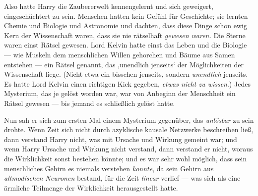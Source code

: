 Also hatte Harry die Zaubererwelt kennengelernt und sich geweigert, eingeschüchtert zu sein. Menschen hatten kein Gefühl für Geschichte; sie lernten Chemie und Biologie und Astronomie und dachten, dass diese Dinge schon ewig Kern der Wissenschaft waren, dass sie nie rätselhaft \emph{gewesen waren.} Die Sterne waren einst Rätsel gewesen. Lord Kelvin hatte einst das Leben und die Biologie — wie Muskeln dem menschlichen Willen gehorchen und Bäume aus Samen entstehen — ein Rätsel genannt, das ‚unendlich jenseits‘ der Möglichkeiten der Wissenschaft liege. (Nicht etwa ein bisschen jenseits, sondern \emph{unendlich} jenseits. Es hatte Lord Kelvin einen richtigen Kick gegeben, \emph{etwas nicht zu wissen}.) Jedes Mysterium, das je gelöst worden war, war von Anbeginn der Menschheit ein Rätsel gewesen — bis jemand es schließlich gelöst hatte.

Nun sah er sich zum ersten Mal einem Mysterium gegenüber, das \emph{unlösbar} zu sein drohte. Wenn Zeit sich nicht durch azyklische kausale Netzwerke beschreiben ließ, dann verstand Harry nicht, was mit Ursache und Wirkung gemeint war; und wenn Harry Ursache und Wirkung nicht verstand, dann verstand er nicht, woraus die Wirklichkeit sonst bestehen könnte; und es war sehr wohl möglich, dass sein menschliches Gehirn es niemals verstehen \emph{konnte}, da sein Gehirn aus \emph{altmodischen Neuronen} bestand, für die Zeit \emph{linear} verlief — was sich als eine ärmliche Teilmenge der Wirklichkeit herausgestellt hatte.

